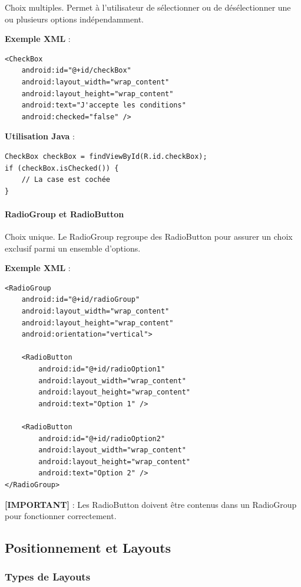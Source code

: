 \documentclass[11pt,a4paper]{article}
\begin{document}
Choix multiples. Permet à l'utilisateur de sélectionner ou de désélectionner une ou plusieurs options indépendamment.

\textbf{Exemple XML} :
\begin{lstlisting}[style=XML]
<CheckBox
    android:id="@+id/checkBox"
    android:layout_width="wrap_content"
    android:layout_height="wrap_content"
    android:text="J'accepte les conditions"
    android:checked="false" />
\end{lstlisting}

\textbf{Utilisation Java} :
\begin{lstlisting}
CheckBox checkBox = findViewById(R.id.checkBox);
if (checkBox.isChecked()) {
    // La case est cochée
}
\end{lstlisting}

\paragraph{RadioGroup et RadioButton}

Choix unique. Le RadioGroup regroupe des RadioButton pour assurer un choix exclusif parmi un ensemble d'options.

\textbf{Exemple XML} :
\begin{lstlisting}[style=XML]
<RadioGroup
    android:id="@+id/radioGroup"
    android:layout_width="wrap_content"
    android:layout_height="wrap_content"
    android:orientation="vertical">
    
    <RadioButton
        android:id="@+id/radioOption1"
        android:layout_width="wrap_content"
        android:layout_height="wrap_content"
        android:text="Option 1" />
    
    <RadioButton
        android:id="@+id/radioOption2"
        android:layout_width="wrap_content"
        android:layout_height="wrap_content"
        android:text="Option 2" />
</RadioGroup>
\end{lstlisting}

\textbf{[IMPORTANT]} : Les RadioButton doivent être contenus dans un RadioGroup pour fonctionner correctement.

\subsection{Positionnement et Layouts}

\subsubsection{Types de Layouts}
\end{document}
